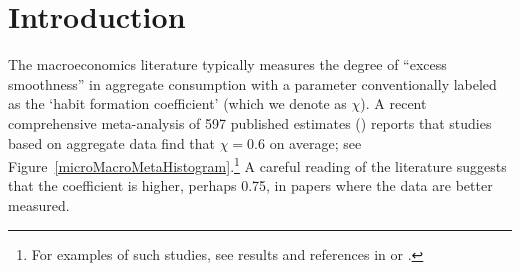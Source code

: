 \documentclass[titlepage]{\econtex}\newcommand{\texname}{cAndCwithStickyE}
\begin{document}
\titlepagefinish
\setcounter{page}{1}

\pagebreak

\section{Introduction}



The macroeconomics literature typically measures the degree of ``excess smoothness'' in aggregate consumption with a parameter conventionally labeled as the `habit formation coefficient' (which we denote as $\chi$). A recent comprehensive meta-analysis of 597 published estimates (\cite{hrsHabit}) reports that studies based on aggregate data find that $\chi=0.6$ on average; see Figure~\ref{microMacroMetaHistogram}.\footnote{For examples of such studies, see results and references in \cite{fuhrer:habits} or \cite{cee:habits}.}  A careful reading of the literature suggests that the coefficient is higher, perhaps 0.75, in papers where the data are better measured.
\end{document}
